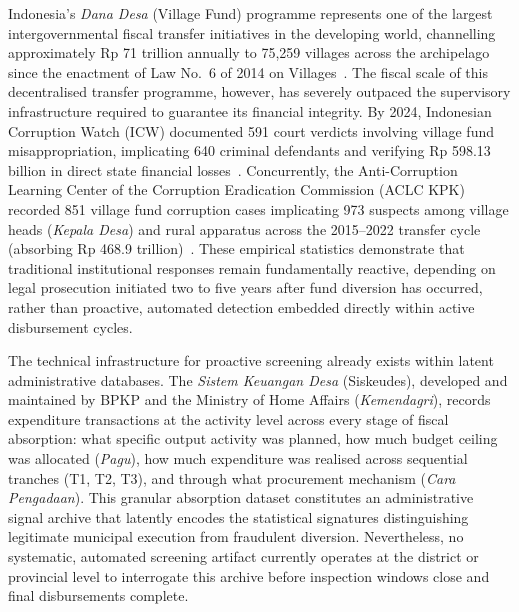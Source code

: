 \documentclass[runningheads]{llncs}
\begin{document}
Indonesia's \textit{Dana Desa} (Village Fund) programme represents one of the largest intergovernmental fiscal transfer initiatives in the developing world, channelling approximately Rp 71 trillion annually to 75,259 villages across the archipelago since the enactment of Law No.\ 6 of 2014 on Villages~\cite{ref1}. The fiscal scale of this decentralised transfer programme, however, has severely outpaced the supervisory infrastructure required to guarantee its financial integrity. By 2024, Indonesian Corruption Watch (ICW) documented 591 court verdicts involving village fund misappropriation, implicating 640 criminal defendants and verifying Rp 598.13 billion in direct state financial losses~\cite{ref2}. Concurrently, the Anti-Corruption Learning Center of the Corruption Eradication Commission (ACLC KPK) recorded 851 village fund corruption cases implicating 973 suspects among village heads (\textit{Kepala Desa}) and rural apparatus across the 2015--2022 transfer cycle (absorbing Rp 468.9 trillion)~\cite{ref3}. These empirical statistics demonstrate that traditional institutional responses remain fundamentally reactive, depending on legal prosecution initiated two to five years after fund diversion has occurred, rather than proactive, automated detection embedded directly within active disbursement cycles.

The technical infrastructure for proactive screening already exists within latent administrative databases. The \textit{Sistem Keuangan Desa} (Siskeudes), developed and maintained by BPKP and the Ministry of Home Affairs (\textit{Kemendagri}), records expenditure transactions at the activity level across every stage of fiscal absorption: what specific output activity was planned, how much budget ceiling was allocated (\textit{Pagu}), how much expenditure was realised across sequential tranches (T1, T2, T3), and through what procurement mechanism (\textit{Cara Pengadaan}). This granular absorption dataset constitutes an administrative signal archive that latently encodes the statistical signatures distinguishing legitimate municipal execution from fraudulent diversion. Nevertheless, no systematic, automated screening artifact currently operates at the district or provincial level to interrogate this archive before inspection windows close and final disbursements complete.
\end{document}
